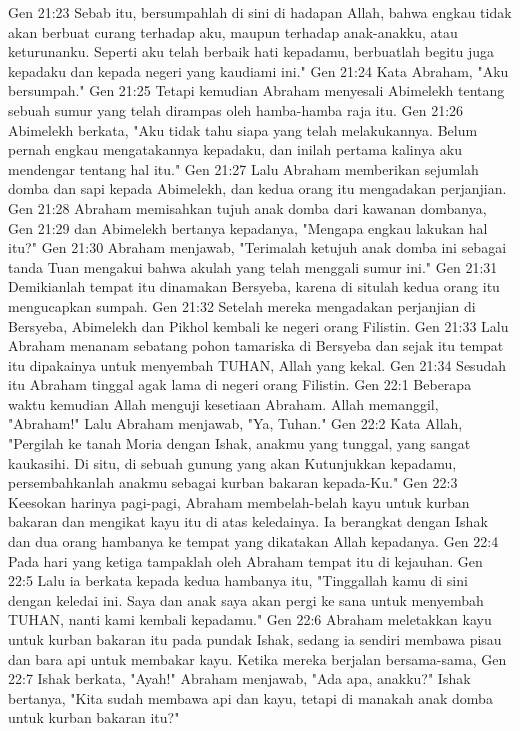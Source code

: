 Gen 21:23  Sebab itu, bersumpahlah di sini di hadapan Allah, bahwa engkau tidak akan berbuat curang terhadap aku, maupun terhadap anak-anakku, atau keturunanku. Seperti aku telah berbaik hati kepadamu, berbuatlah begitu juga kepadaku dan kepada negeri yang kaudiami ini."
Gen 21:24  Kata Abraham, "Aku bersumpah."
Gen 21:25  Tetapi kemudian Abraham menyesali Abimelekh tentang sebuah sumur yang telah dirampas oleh hamba-hamba raja itu.
Gen 21:26  Abimelekh berkata, "Aku tidak tahu siapa yang telah melakukannya. Belum pernah engkau mengatakannya kepadaku, dan inilah pertama kalinya aku mendengar tentang hal itu."
Gen 21:27  Lalu Abraham memberikan sejumlah domba dan sapi kepada Abimelekh, dan kedua orang itu mengadakan perjanjian.
Gen 21:28  Abraham memisahkan tujuh anak domba dari kawanan dombanya,
Gen 21:29  dan Abimelekh bertanya kepadanya, "Mengapa engkau lakukan hal itu?"
Gen 21:30  Abraham menjawab, "Terimalah ketujuh anak domba ini sebagai tanda Tuan mengakui bahwa akulah yang telah menggali sumur ini."
Gen 21:31  Demikianlah tempat itu dinamakan Bersyeba, karena di situlah kedua orang itu mengucapkan sumpah.
Gen 21:32  Setelah mereka mengadakan perjanjian di Bersyeba, Abimelekh dan Pikhol kembali ke negeri orang Filistin.
Gen 21:33  Lalu Abraham menanam sebatang pohon tamariska di Bersyeba dan sejak itu tempat itu dipakainya untuk menyembah TUHAN, Allah yang kekal.
Gen 21:34  Sesudah itu Abraham tinggal agak lama di negeri orang Filistin.
Gen 22:1  Beberapa waktu kemudian Allah menguji kesetiaan Abraham. Allah memanggil, "Abraham!" Lalu Abraham menjawab, "Ya, Tuhan."
Gen 22:2  Kata Allah, "Pergilah ke tanah Moria dengan Ishak, anakmu yang tunggal, yang sangat kaukasihi. Di situ, di sebuah gunung yang akan Kutunjukkan kepadamu, persembahkanlah anakmu sebagai kurban bakaran kepada-Ku."
Gen 22:3  Keesokan harinya pagi-pagi, Abraham membelah-belah kayu untuk kurban bakaran dan mengikat kayu itu di atas keledainya. Ia berangkat dengan Ishak dan dua orang hambanya ke tempat yang dikatakan Allah kepadanya.
Gen 22:4  Pada hari yang ketiga tampaklah oleh Abraham tempat itu di kejauhan.
Gen 22:5  Lalu ia berkata kepada kedua hambanya itu, "Tinggallah kamu di sini dengan keledai ini. Saya dan anak saya akan pergi ke sana untuk menyembah TUHAN, nanti kami kembali kepadamu."
Gen 22:6  Abraham meletakkan kayu untuk kurban bakaran itu pada pundak Ishak, sedang ia sendiri membawa pisau dan bara api untuk membakar kayu. Ketika mereka berjalan bersama-sama,
Gen 22:7  Ishak berkata, "Ayah!" Abraham menjawab, "Ada apa, anakku?" Ishak bertanya, "Kita sudah membawa api dan kayu, tetapi di manakah anak domba untuk kurban bakaran itu?"
